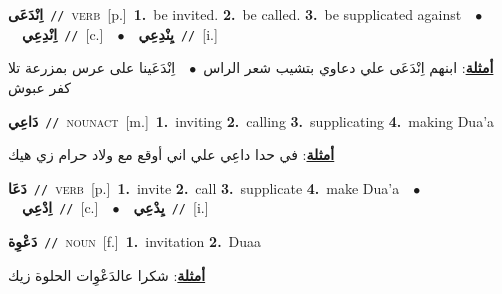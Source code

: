 \documentclass[10pt,a4paper,twoside]{article} %
\begin{document}
\begin{multicols}{2}
{\setlength\topsep{0pt}\textbf{\foreignlanguage{arabic}{اِنْدَعَى}}\ {\color{gray}\texttt{//}\color{black}}\ \textsc{verb}\ [p.]\ \textbf{1.}~be invited.  \textbf{2.}~be called.  \textbf{3.}~be supplicated against\ \ $\bullet$\ \ \setlength\topsep{0pt}\textbf{\foreignlanguage{arabic}{اِنْدِعِي}}\ {\color{gray}\texttt{//}\color{black}}\ [c.]\ \ $\bullet$\ \ \setlength\topsep{0pt}\textbf{\foreignlanguage{arabic}{يِنْدِعِي}}\ {\color{gray}\texttt{//}\color{black}}\ [i.]\  \begin{flushright}\color{gray}\foreignlanguage{arabic}{\textbf{\underline{\foreignlanguage{arabic}{أمثلة}}}: ابنهم اِنْدَعَى علي دعاوي بتشيب شعر الراس\ $\bullet$\ \  اِنْدَعَينا على عرس بمزرعة تلا كفر عبوش}\end{flushright}\color{black}} \vspace{2mm}

{\setlength\topsep{0pt}\textbf{\foreignlanguage{arabic}{دَاعِي}}\ {\color{gray}\texttt{//}\color{black}}\ \textsc{noun\textunderscore act}\ [m.]\ \textbf{1.}~inviting  \textbf{2.}~calling  \textbf{3.}~supplicating  \textbf{4.}~making Dua'a\  \begin{flushright}\color{gray}\foreignlanguage{arabic}{\textbf{\underline{\foreignlanguage{arabic}{أمثلة}}}: في حدا داعِي علي اني أوقع مع ولاد حرام زي هيك}\end{flushright}\color{black}} \vspace{2mm}

{\setlength\topsep{0pt}\textbf{\foreignlanguage{arabic}{دَعَا}}\ {\color{gray}\texttt{//}\color{black}}\ \textsc{verb}\ [p.]\ \textbf{1.}~invite  \textbf{2.}~call  \textbf{3.}~supplicate  \textbf{4.}~make Dua'a\ \ $\bullet$\ \ \setlength\topsep{0pt}\textbf{\foreignlanguage{arabic}{اِدْعِي}}\ {\color{gray}\texttt{//}\color{black}}\ [c.]\ \ $\bullet$\ \ \setlength\topsep{0pt}\textbf{\foreignlanguage{arabic}{يِدْعِي}}\ {\color{gray}\texttt{//}\color{black}}\ [i.]\ } \vspace{2mm}

{\setlength\topsep{0pt}\textbf{\foreignlanguage{arabic}{دَعْوِة}}\ {\color{gray}\texttt{//}\color{black}}\ \textsc{noun}\ [f.]\ \textbf{1.}~invitation  \textbf{2.}~Duaa\  \begin{flushright}\color{gray}\foreignlanguage{arabic}{\textbf{\underline{\foreignlanguage{arabic}{أمثلة}}}: شكرا عالدَعْوِات الحلوة زيك}\end{flushright}\color{black}} \vspace{2mm}


\end{multicols}
\end{document}

